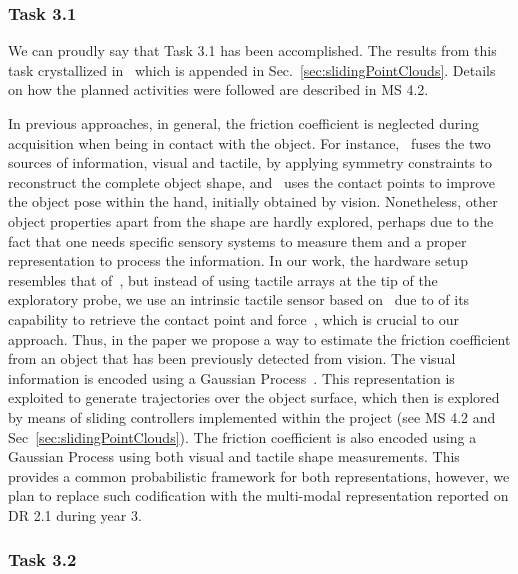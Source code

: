 \documentclass[a4paper,11pt,pdf]{pacmanreport}
\begin{document}
\subsubsection{Task 3.1}

We can proudly say that Task 3.1 has been accomplished. The results from this task crystallized in~\cite{Rosales2014Active} which is appended in Sec.~\ref{sec:slidingPointClouds}. Details on how the planned activities were followed are described in MS 4.2.

In previous approaches, in general, the friction coefficient is neglected during acquisition when being in contact with the object. For instance,~\cite{Ilonen2013Fusing} fuses the two sources of information, visual and tactile, by applying symmetry constraints to reconstruct the complete object shape, and~\cite{Chalon2013Online} uses the contact points to improve the object pose within the hand, initially obtained by vision. Nonetheless, other object properties apart from the shape are hardly explored, perhaps due to the fact that one needs specific sensory systems to measure them and a proper representation to process the information. In our work, the hardware setup resembles that of~\cite{Bajcsy1984What}, but instead of using tactile arrays at the tip of the exploratory probe, we use an intrinsic tactile sensor based on~\cite{Serio2014Tactile} due to of its capability to retrieve the contact point and force~\cite{Bicchi1993Contact}, which is crucial to our approach. Thus, in the paper we propose a way to estimate the friction coefficient from an object that has been previously detected from vision. The visual information is encoded using a Gaussian Process~\cite{Rasmussen2006Gaussian}. This representation is exploited to generate trajectories over the object surface, which then is explored by means of sliding controllers implemented within the project (see MS 4.2 and Sec~\ref{sec:slidingPointClouds}). The friction coefficient is also encoded using a Gaussian Process using both visual and tactile shape measurements. This provides a common probabilistic framework for both representations, however, we plan to replace such codification with the multi-modal representation reported on DR 2.1 during year 3.

% 

\subsubsection{Task 3.2}
\end{document}
